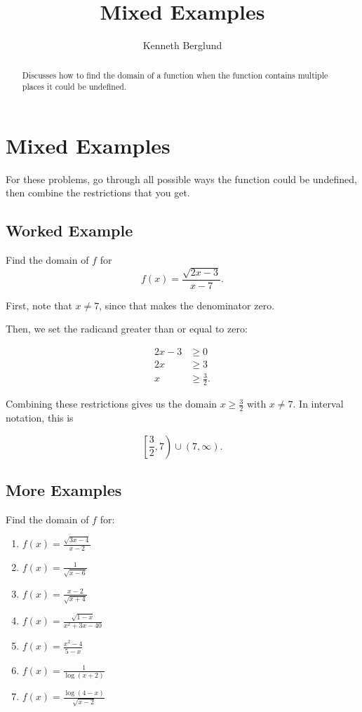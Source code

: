 \documentclass{ximera}
\title{Mixed Examples}
\author{Kenneth Berglund}
\begin{document}
\begin{abstract}
Discusses how to find the domain of  a function when the function contains multiple places it could be undefined. 
\end{abstract}
\maketitle

\section{Mixed Examples}
For these problems, go through all possible ways the function could be undefined, then combine the restrictions that you get.

\subsection{Worked Example}
Find the domain of $f$ for $$f(x) = \frac{\sqrt{2x - 3}}{x - 7}.$$

\begin{explanation}
First, note that $x \ne 7$, since that makes the denominator zero.

Then, we set the radicand greater than or equal to zero:

\begin{align*}2x-3&\ge 0 \\ 2x & \ge 3 \\ x & \ge \frac{3}{2}. \end{align*}

Combining these restrictions gives us the domain $x \ge \frac{3}{2}$ with $x \ne 7$. In interval notation, this is

$$\left[\frac{3}{2}, 7\right) \cup (7, \infty).$$
\end{explanation}
\subsection{More Examples}
Find the domain of $f$ for:

\begin{enumerate}
	\item $f(x) = \frac{\sqrt{3x - 4}}{x - 2}$
	\item $f(x) = \frac{1}{\sqrt{x - 6}}$
	\item $f(x) = \frac{x - 2}{\sqrt{x + 4}}$
	\item $f(x) = \frac{\sqrt{1-x}}{x^2 + 3x - 40}$
	\item $f(x) = \frac{x^2 - 4}{5 - x}$
	\item $f(x) = \frac{1}{\log(x + 2)}$
	\item $f(x) = \frac{\log(4 - x)}{\sqrt{x - 2}}$
\end{enumerate}
\end{document}
